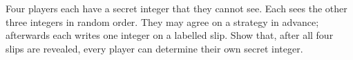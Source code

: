 Four players each have a secret integer that they cannot see. Each sees the other three integers in random order. They may agree on a strategy in advance; afterwards each writes one integer on a labelled slip. Show that, after all four slips are revealed, every player can determine their own secret integer.
